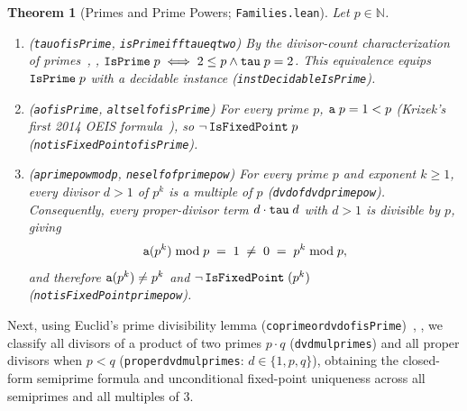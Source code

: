 \documentclass[11pt,reqno]{amsart}
\theoremstyle{plain}
\newtheorem{theorem}{Theorem}[section]
\theoremstyle{definition}
\theoremstyle{remark}
\newcommand{\leanid}[1]{\texttt{\upshape\def\_{\char95\relax}#1}}
\newcommand{\N}{\mathbb{N}}
\begin{document}
\begin{theorem}[Primes and Prime Powers; \leanid{Families.lean}]
\label{thm:primes_powers}
Let $p \in \N$.
\begin{enumerate}
  \item (\leanid{tau\_\allowbreak of\_\allowbreak isPrime}, \leanid{isPrime\_\allowbreak iff\_\allowbreak tau\_\allowbreak eq\_\allowbreak two}) By the divisor-count characterization of primes~\cite[Ch.~2]{Apostol1976}, \cite[Ch.~6]{Burton1976}, $\leanid{IsPrime}\;p \iff 2 \le p \land \leanid{tau}\;p = 2$. This equivalence equips $\leanid{IsPrime}\;p$ with a decidable instance (\leanid{instDecidableIsPrime}).
  \item (\leanid{a\_\allowbreak of\_\allowbreak isPrime}, \leanid{a\_\allowbreak lt\_\allowbreak self\_\allowbreak of\_\allowbreak isPrime}) For every prime $p$, $\leanid{a}\;p = 1 < p$ (Krizek's first 2014 OEIS formula~\cite{OEIS-A245211}), so $\neg\,\leanid{IsFixedPoint}\;p$ (\leanid{not\_\allowbreak isFixedPoint\_\allowbreak of\_\allowbreak isPrime}).
  \item (\leanid{a\_\allowbreak prime\_\allowbreak pow\_\allowbreak mod\_\allowbreak p}, \leanid{ne\_\allowbreak self\_\allowbreak of\_\allowbreak prime\_\allowbreak pow}) For every prime $p$ and exponent $k \ge 1$, every divisor $d > 1$ of $p^k$ is a multiple of $p$ (\leanid{dvd\_\allowbreak of\_\allowbreak dvd\_\allowbreak prime\_\allowbreak pow}). Consequently, every proper-divisor term $d \cdot \leanid{tau}\;d$ with $d > 1$ is divisible by $p$, giving
  \[
    \leanid{a}(p^k) \bmod p \;=\; 1 \;\ne\; 0 \;=\; p^k \bmod p,
  \]
  and therefore $\leanid{a}(p^k) \ne p^k$ and $\neg\,\leanid{IsFixedPoint}\;(p^k)$ (\leanid{not\_\allowbreak isFixedPoint\_\allowbreak prime\_\allowbreak pow}).
\end{enumerate}
\end{theorem}

Next, using Euclid's prime divisibility lemma (\leanid{coprime\_\allowbreak or\_\allowbreak dvd\_\allowbreak of\_\allowbreak isPrime})~\cite[Ch.~1]{Apostol1976}, \cite[Ch.~2]{Burton1976}, we classify all divisors of a product of two primes $p \cdot q$ (\leanid{dvd\_\allowbreak mul\_\allowbreak primes}) and all proper divisors when $p < q$ (\leanid{proper\_\allowbreak dvd\_\allowbreak mul\_\allowbreak primes}: $d \in \{1, p, q\}$), obtaining the closed-form semiprime formula and unconditional fixed-point uniqueness across all semiprimes and all multiples of $3$.
\end{document}
